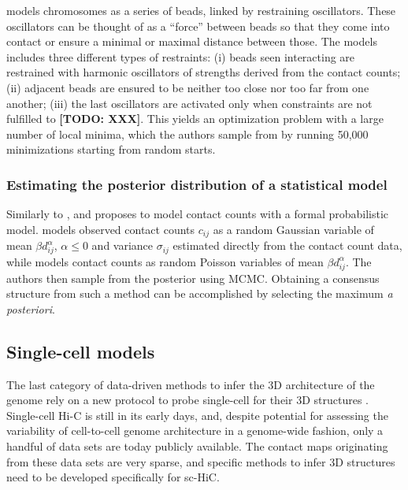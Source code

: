 \documentclass[2columns]{article}
\newcommand{\todo}[1]{\textbf{[TODO: #1]}}
\begin{document}
\citet{umbarger:three-dimensional,bau:three-dimensional, kalhor:genome} models
chromosomes as a series of beads, linked by restraining oscillators. These
oscillators can be thought of as a ``force'' between beads so that they come
into contact or ensure a minimal or maximal distance between those. The models
includes three different types of restraints: (i) beads seen interacting are
restrained with harmonic oscillators of strengths derived from the contact
counts; (ii) adjacent beads are ensured to be neither too close nor too far
from one another; (iii) the last oscillators are activated only when
constraints are not fulfilled to \todo{XXX}.  This yields an optimization problem
with a large number of local minima, which the authors sample from by running
50,000 minimizations starting from random starts.

\subsubsection*{Estimating the posterior distribution of a statistical model}

Similarly to \citet{varoquaux:statistical}, \citet{rousseau:three} and
\citet{hu:bayesian} proposes to model contact counts with a formal
probabilistic model. \citet{rousseau:three} models observed contact counts
$c_{ij}$ as a random Gaussian variable of mean $\beta d_{ij}^{\alpha}$,
$\alpha \leq 0$ and variance $\sigma_{ij}$ estimated directly from the contact
count data, while \citet{hu:bayesian} models contact counts as random Poisson
variables of mean $\beta d_{ij}^\alpha$. The authors then sample from the
posterior using MCMC. Obtaining a consensus structure from such a method can
be accomplished by selecting the maximum {\em a posteriori}.

\subsection*{Single-cell models}

The last category of data-driven methods to infer the 3D architecture of the
genome rely on a new protocol to probe single-cell for their 3D structures
\citep{nagano:single-cell,ramani:massively}. Single-cell Hi-C is still in its
early days, and, despite potential for assessing the variability of
cell-to-cell genome architecture in a genome-wide fashion, only a handful of
data sets are today publicly available. The contact maps originating from
these data sets are very sparse, and specific methods to infer 3D structures
need to be developed specifically for sc-HiC. 
\end{document}
